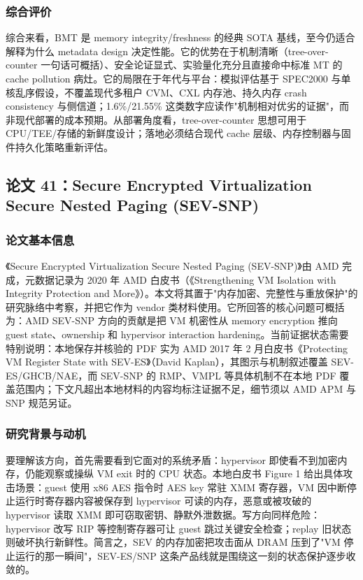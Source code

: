 \documentclass[11pt]{ctexart}
\begin{document}
\subsubsection{综合评价}
综合来看，BMT 是 memory integrity/freshness 的经典 SOTA 基线，至今仍适合解释为什么 metadata design 决定性能。它的优势在于机制清晰（tree-over-counter 一句话可概括）、安全论证显式、实验量化充分且直接命中标准 MT 的 cache pollution 病灶。它的局限在于年代与平台：模拟评估基于 SPEC2000 与单核乱序假设，不覆盖现代多租户 CVM、CXL 内存池、持久内存 crash consistency 与侧信道；1.6\%/21.55\% 这类数字应读作"机制相对优劣的证据"，而非现代部署的成本预期。从部署角度看，tree-over-counter 思想可用于 CPU/TEE/存储的新鲜度设计；落地必须结合现代 cache 层级、内存控制器与固件持久化策略重新评估。\par
\subsection{论文 41：Secure Encrypted Virtualization Secure Nested Paging (SEV-SNP)}
\subsubsection{论文基本信息}
《Secure Encrypted Virtualization Secure Nested Paging (SEV-SNP)》由 AMD 完成，元数据记录为 2020 年 AMD 白皮书（《Strengthening VM Isolation with Integrity Protection and More》）。本文将其置于"内存加密、完整性与重放保护"的研究脉络中考察，并把它作为 vendor 类材料使用。它所回答的核心问题可概括为：AMD SEV-SNP 方向的贡献是把 VM 机密性从 memory encryption 推向 guest state、ownership 和 hypervisor interaction hardening。当前证据状态需要特别说明：本地保存并核验的 PDF 实为 AMD 2017 年 2 月白皮书《Protecting VM Register State with SEV-ES》（David Kaplan），其图示与机制叙述覆盖 SEV-ES/GHCB/NAE，而 SEV-SNP 的 RMP、VMPL 等具体机制不在本地 PDF 覆盖范围内；下文凡超出本地材料的内容均标注证据不足，细节须以 AMD APM 与 SNP 规范另证。\cite{amd_sev_snp}\par
\subsubsection{研究背景与动机}
要理解该方向，首先需要看到它面对的系统矛盾：hypervisor 即使看不到加密内存，仍能观察或操纵 VM exit 时的 CPU 状态。本地白皮书 Figure 1 给出具体攻击场景：guest 使用 x86 AES 指令时 AES key 常驻 XMM 寄存器，VM 因中断停止运行时寄存器内容被保存到 hypervisor 可读的内存，恶意或被攻破的 hypervisor 读取 XMM 即可窃取密钥、静默外泄数据。写方向同样危险：hypervisor 改写 RIP 等控制寄存器可让 guest 跳过关键安全检查；replay 旧状态则破坏执行新鲜性。简言之，SEV 的内存加密把攻击面从 DRAM 压到了"VM 停止运行的那一瞬间"，SEV-ES/SNP 这条产品线就是围绕这一刻的状态保护逐步收敛的。\par
\end{document}
